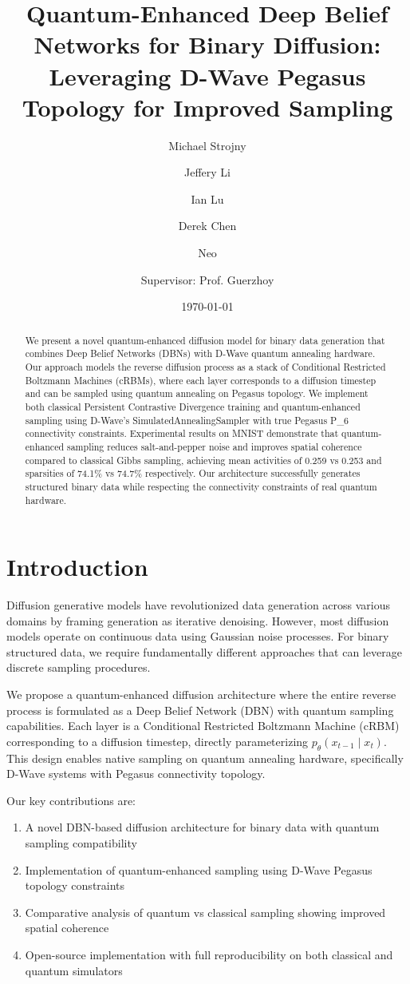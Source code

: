 \documentclass[11pt]{article}
\title{\bfseries Quantum-Enhanced Deep Belief Networks for Binary Diffusion: \\
Leveraging D-Wave Pegasus Topology for Improved Sampling}
\author[1]{Michael Strojny}
\author[1]{Jeffery Li}
\author[1]{Ian Lu}
\author[1]{Derek Chen}
\author[1]{Neo}
\author[1]{Supervisor: Prof. Guerzhoy}
\affil[1]{University of Toronto, Department of Computer Science}
\date{\today}
\begin{document}
\maketitle

\begin{abstract}
We present a novel quantum-enhanced diffusion model for binary data generation that combines Deep Belief Networks (DBNs) with D-Wave quantum annealing hardware. Our approach models the reverse diffusion process as a stack of Conditional Restricted Boltzmann Machines (cRBMs), where each layer corresponds to a diffusion timestep and can be sampled using quantum annealing on Pegasus topology. We implement both classical Persistent Contrastive Divergence training and quantum-enhanced sampling using D-Wave's SimulatedAnnealingSampler with true Pegasus P_6 connectivity constraints. Experimental results on MNIST demonstrate that quantum-enhanced sampling reduces salt-and-pepper noise and improves spatial coherence compared to classical Gibbs sampling, achieving mean activities of 0.259 vs 0.253 and sparsities of 74.1\% vs 74.7\% respectively. Our architecture successfully generates structured binary data while respecting the connectivity constraints of real quantum hardware.
\end{abstract}

\section{Introduction}

Diffusion generative models have revolutionized data generation across various domains by framing generation as iterative denoising. However, most diffusion models operate on continuous data using Gaussian noise processes. For binary structured data, we require fundamentally different approaches that can leverage discrete sampling procedures.

We propose a quantum-enhanced diffusion architecture where the entire reverse process is formulated as a Deep Belief Network (DBN) with quantum sampling capabilities. Each layer is a Conditional Restricted Boltzmann Machine (cRBM) corresponding to a diffusion timestep, directly parameterizing $p_\theta(x_{t-1}\mid x_t)$. This design enables native sampling on quantum annealing hardware, specifically D-Wave systems with Pegasus connectivity topology.

Our key contributions are:
\begin{enumerate}
    \item A novel DBN-based diffusion architecture for binary data with quantum sampling compatibility
    \item Implementation of quantum-enhanced sampling using D-Wave Pegasus topology constraints  
    \item Comparative analysis of quantum vs classical sampling showing improved spatial coherence
    \item Open-source implementation with full reproducibility on both classical and quantum simulators
\end{enumerate}
\end{document}
